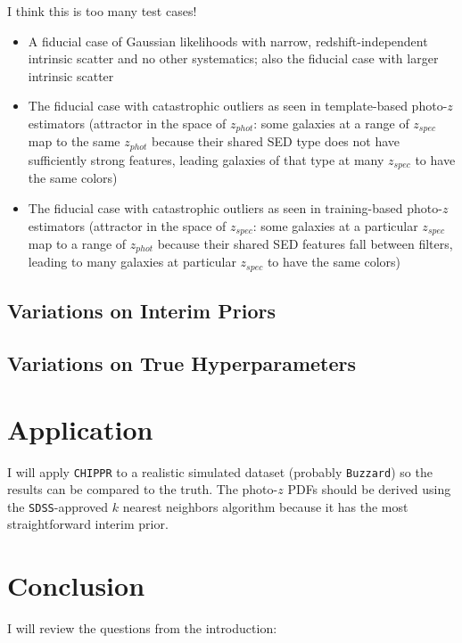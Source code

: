 \documentclass[preprint]{aastex}
\newcommand{\chippr}{\texttt{CHIPPR} }
\begin{document}
I think this is too many test cases!

\begin{itemize}
	\item A fiducial case of Gaussian likelihoods with narrow, 
redshift-independent intrinsic scatter and no other systematics; also the 
fiducial case with larger intrinsic scatter
	\item The fiducial case with catastrophic outliers as seen in 
template-based photo-$z$ estimators (attractor in the space of $z_{phot}$: some 
galaxies at a range of $z_{spec}$ map to the same $z_{phot}$ because their 
shared SED type does not have sufficiently strong features, leading galaxies of 
that type at many $z_{spec}$ to have the same colors)
	\item The fiducial case with catastrophic outliers as seen in 
training-based photo-$z$ estimators (attractor in the space of $z_{spec}$: some 
galaxies at a particular $z_{spec}$ map to a range of $z_{phot}$ because their 
shared SED features fall between filters, leading to many galaxies at 
particular $z_{spec}$ to have the same colors)
\end{itemize}

\subsection{Variations on Interim Priors}
\label{sec:priors}

\subsection{Variations on True Hyperparameters}
\label{sec:truth}

\section{Application}
\label{sec:application}

I will apply \chippr to a realistic simulated dataset (probably 
\texttt{Buzzard}) so the results can be compared to the truth.  The photo-$z$ 
PDFs should be derived using the \texttt{SDSS}-approved $k$ nearest neighbors 
algorithm because it has the most straightforward interim prior.

\section{Conclusion}
\label{sec:conclusion}

I will review the questions from the introduction:
\end{document}
